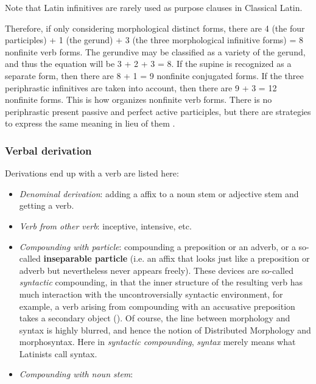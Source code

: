\documentclass{article}
\newcommand*{\citesec}[1]{\S~{#1}}
\newcommand*{\concept}[1]{\textbf{#1}}
\newcommand*{\term}[1]{\emph{#1}}
\begin{document}
\begin{itemize}
    Note that Latin infinitives are rarely used as purpose clauses in Classical Latin.
\end{itemize} 

Therefore, if only considering morphological distinct forms,
there are 4 (the four participles) + 1 (the gerund) + 3 (the three morphological infinitive forms) = 8
nonfinite verb forms.
The gerundive may be classified as a variety of the gerund, 
and thus the equation will be 3 + 2 + 3 = 8.
If the supine is recognized as a separate form,
then there are 8 + 1 = 9 nonfinite conjugated forms.
If the three periphrastic infinitives are taken into account,
then there are 9 + 3 = 12 nonfinite forms.
This is how \citet{allen1903allen} organizes nonfinite verb forms.
There is no periphrastic present passive and perfect active participles,
but there are strategies to express the same meaning 
in lieu of them \citep[\citesec{491-493}]{allen1903allen}.

\subsubsection{Verbal derivation}\label{sec:verb-derivation-abs}

Derivations end up with a verb are listed here:
\begin{itemize}
    \item \emph{Denominal derivation}: adding a affix to a noun stem or adjective stem and getting a verb.
    \item \emph{Verb from other verb}: inceptive, intensive, etc. 
    \item \emph{Compounding with particle}: compounding a preposition or an adverb, 
    or a so-called \concept{inseparable particle} 
    (i.e. an affix that looks just like a preposition or adverb but nevertheless never appears freely).
    These devices are so-called \emph{syntactic} compounding,
    in that the inner structure of the resulting verb has much interaction 
    with the uncontroversially syntactic environment, 
    for example, a verb arising from compounding with an accusative preposition 
    takes a secondary object ().
    Of course, the line between morphology and syntax is highly blurred,
    and hence the notion of Distributed Morphology and morphosyntax.
    Here in \term{syntactic compounding}, \term{syntax} merely means what Latinists call syntax.
    \item \emph{Compounding with noun stem}: 
\end{itemize}
\end{document}
